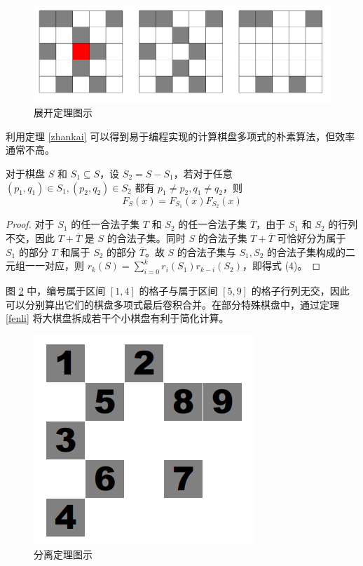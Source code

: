 \documentclass{noithesis}
\begin{document}
	\begin{figure}[h]
		\centering
		\caption{展开定理图示}
		\label{f2-1}
		\includegraphics[scale=0.4]{picture/ppt-figure1.png}
	\end{figure}
	
	利用定理 \ref{zhankai} 可以得到易于编程实现的计算棋盘多项式的朴素算法，但效率通常不高。
	
	\begin{theorem}\label{fenli}
		对于棋盘 $S$ 和 $S_1 \subseteq S$，设 $S_2 = S - S_1$，若对于任意 $(p_1,q_1) \in S_1 , (p_2,q_2) \in S_2$ 都有 $p_1 \neq p_2,q_1 \neq q_2$，则\begin{equation}
		F_S(x) = F_{S_1}(x)F_{S_2}(x)
		\end{equation}
	\end{theorem}
	\begin{proof}
		对于 $S_1$ 的任一合法子集 $T$ 和 $S_2$ 的任一合法子集 $\overline T$，由于 $S_1$ 和 $S_2$ 的行列不交，因此 $T + \overline T$ 是 $S$ 的合法子集。同时 $S$ 的合法子集 $T+\overline T$ 可恰好分为属于 $S_1$ 的部分 $T$ 和属于 $S_2$ 的部分 $\overline T$。故 $S$ 的合法子集与 $S_1,S_2$ 的合法子集构成的二元组一一对应，则 $r_k(S) = \sum_{i=0}^k r_i(S_1)r_{k-i}(S_2)$，即得式 (4)。
	\end{proof}
	
	图 \ref{f3} 中，编号属于区间 $[1,4]$ 的格子与属于区间 $[5,9]$ 的格子行列无交，因此可以分别算出它们的棋盘多项式最后卷积合并。在部分特殊棋盘中，通过定理 \ref{fenli} 将大棋盘拆成若干个小棋盘有利于简化计算。
	
	\begin{figure}[h]
		\centering
		\caption{分离定理图示}
		\label{f3}
		\includegraphics[scale=0.43]{picture/figure3.png}
	\end{figure}
	
\end{document}
